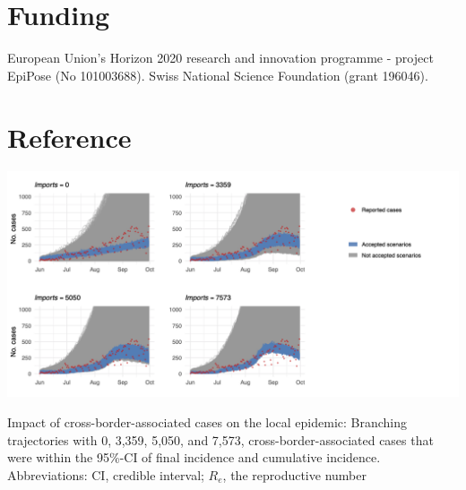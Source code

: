 \documentclass[10pt, a4paper, twoside]{article}
\begin{document}
\begin{multicols}{2}
\section{Funding}
European Union’s Horizon 2020 research and innovation programme - project EpiPose (No 101003688). Swiss National Science Foundation (grant 196046).

\section{Reference}



\end{multicols}

\clearpage
\begin{suppfigure}[h]
\centering
\includegraphics[scale=0.3]{SF1_2021-04-30.png}
\caption{Impact of cross-border-associated cases on the local epidemic:
Branching trajectories with 0, 3,359, 5,050, and 7,573, cross-border-associated cases that were within the 95\%-CI of final incidence and cumulative incidence.
Abbreviations: CI, credible interval; $R_e$, the reproductive number}
\label{sf1}
\end{suppfigure}
\end{document}
